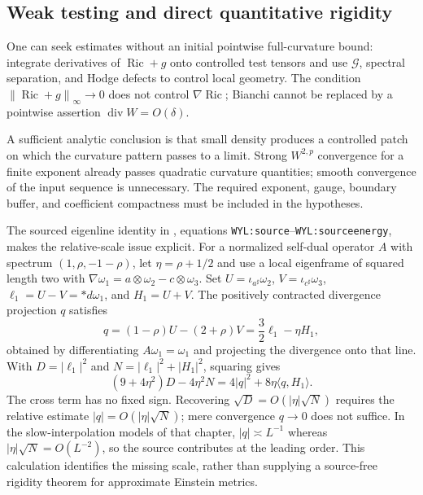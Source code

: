 \documentclass[a4paper,11pt]{article}
\numberwithin{equation}{section}
\theoremstyle{definition}
\newcommand{\Ric}{\operatorname{Ric}}
\newcommand{\norm}[1]{\left\lVert#1\right\rVert}
\begin{document}
\subsection{Weak testing and direct quantitative rigidity}
One can seek estimates without an initial pointwise full-curvature bound: integrate derivatives of $\Ric+g$ onto controlled test tensors and use $\mathcal G$, spectral separation, and Hodge defects to control local geometry. The condition $\norm{\Ric+g}_\infty\to0$ does not control $\nabla\Ric$; Bianchi cannot be replaced by a pointwise assertion $\operatorname{div}W=O(\delta)$.

A sufficient analytic conclusion is that small density produces a controlled patch on which the curvature pattern passes to a limit. Strong $W^{2,p}$ convergence for a finite exponent already passes quadratic curvature quantities; smooth convergence of the input sequence is unnecessary. The required exponent, gauge, boundary buffer, and coefficient compactness must be included in the hypotheses.

The sourced eigenline identity in , equations \texttt{WYL:source}--\texttt{WYL:sourceenergy}, makes the relative-scale issue explicit. For a normalized self-dual operator $A$ with spectrum $(1,\rho,-1-\rho)$, let $\eta=\rho+1/2$ and use a local eigenframe of squared length two with
$\nabla\omega_1=a\otimes\omega_2-c\otimes\omega_3$.
Set $U=\iota_{a^\sharp}\omega_2$, $V=\iota_{c^\sharp}\omega_3$, $\ell_1=U-V=*d\omega_1$, and $H_1=U+V$. The positively contracted divergence projection $q$ satisfies
\begin{equation}\label{eq:sourced-eigenline}
q=(1-\rho)U-(2+\rho)V=\frac32\ell_1-\eta H_1,
\end{equation}
obtained by differentiating $A\omega_1=\omega_1$ and projecting the divergence onto that line. With $D=|\ell_1|^2$ and $N=|\ell_1|^2+|H_1|^2$, squaring gives
\begin{equation}\label{eq:sourced-eigenline-energy}
(9+4\eta^2)D-4\eta^2N
=4|q|^2+8\eta\langle q,H_1\rangle.
\end{equation}
The cross term has no fixed sign. Recovering $\sqrt D=O(|\eta|\sqrt N)$ requires the relative estimate $|q|=O(|\eta|\sqrt N)$; mere convergence $q\to0$ does not suffice. In the slow-interpolation models of that chapter, $|q|\asymp L^{-1}$ whereas $|\eta|\sqrt N=O(L^{-2})$, so the source contributes at the leading order. This calculation identifies the missing scale, rather than supplying a source-free rigidity theorem for approximate Einstein metrics.
\end{document}
